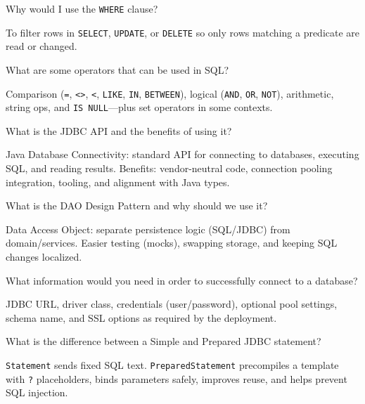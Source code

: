 \question[4]
Why would I use the \texttt{WHERE} clause?
\makeemptybox{1.05in}
\begin{solution}
  To filter rows in \texttt{SELECT}, \texttt{UPDATE}, or \texttt{DELETE} so only rows matching a predicate are read or changed.
\end{solution}

\question[4]
What are some operators that can be used in SQL?
\makeemptybox{1.35in}
\begin{solution}
  Comparison (\texttt{=}, \texttt{<>}, \texttt{<}, \texttt{LIKE}, \texttt{IN}, \texttt{BETWEEN}), logical (\texttt{AND}, \texttt{OR}, \texttt{NOT}), arithmetic, string ops, and \texttt{IS NULL}---plus set operators in some contexts.
\end{solution}

\newpage


\question[4]
What is the JDBC API and the benefits of using it?
\makeemptybox{1.35in}
\begin{solution}
  Java Database Connectivity: standard API for connecting to databases, executing SQL, and reading results. Benefits: vendor-neutral code, connection pooling integration, tooling, and alignment with Java types.
\end{solution}

\question[4]
What is the DAO Design Pattern and why should we use it?
\makeemptybox{1.35in}
\begin{solution}
  Data Access Object: separate persistence logic (SQL/JDBC) from domain/services. Easier testing (mocks), swapping storage, and keeping SQL changes localized.
\end{solution}

\question[4]
What information would you need in order to successfully connect to a database?
\makeemptybox{1.35in}
\begin{solution}
  JDBC URL, driver class, credentials (user/password), optional pool settings, schema name, and SSL options as required by the deployment.
\end{solution}

\question[4]
What is the difference between a Simple and Prepared JDBC statement?
\makeemptybox{1.35in}
\begin{solution}
  \texttt{Statement} sends fixed SQL text. \texttt{PreparedStatement} precompiles a template with \texttt{?} placeholders, binds parameters safely, improves reuse, and helps prevent SQL injection.
\end{solution}

